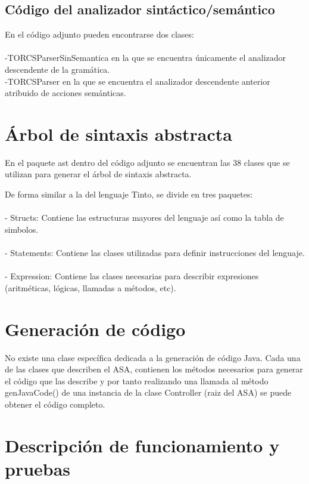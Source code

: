 \documentclass[11pt]{article}
\begin{document}
\subsection{Código del analizador sintáctico/semántico}

En el código adjunto pueden encontrarse dos clases:
\\ \\
-TORCSParserSinSemantica en la que se encuentra únicamente el analizador descendente de la gramática.
\\
-TORCSParser en la que se encuentra el analizador descendente anterior atribuido de acciones semánticas.

\section{Árbol de sintaxis abstracta}

En el paquete ast dentro del código adjunto se encuentran las 38 clases que se utilizan para generar el árbol de sintaxis abstracta.

De forma similar a la del lenguaje Tinto, se divide en tres paquetes:
\\ \\
- Structs: Contiene las estructuras mayores del lenguaje así como la tabla de simbolos.
\\ \\
- Statements: Contiene las clases utilizadas para definir instrucciones del lenguaje.
\\ \\
- Expression: Contiene las clases necesarias para describir expresiones (aritméticas, lógicas, llamadas a métodos, etc).

\section{Generación de código}

No existe una clase específica dedicada a la generación de código Java. Cada una de las clases que describen el ASA, contienen
los métodos necesarios para generar el código que las describe y por tanto realizando una llamada al método genJavaCode() de
una instancia de la clase Controller (raiz del ASA) se puede obtener el código completo.

\newpage
\section{Descripción de funcionamiento y pruebas}
\end{document}
